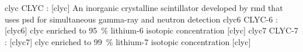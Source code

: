 \newglsXchemical%
{clyc}%
{CLYC}%
{:}%
[clyc]%
{An inorganic crystalline scintillator developed by \gls{rmd} that uses \gls{psd} for simultaneous \gls{gamma-ray} and neutron detection}%
\newglsXchemical%
{clyc6}%
{CLYC-6}%
{{}:}%
[clyc6]%
{\Glsdesc{clyc} enriched to \SI{95}{\percent} lithium-6 isotopic concentration}%
[clyc]%
\newglsXchemical%
{clyc7}%
{CLYC-7}%
{{}:}%
[clyc7]%
{\Glsdesc{clyc} enriched to \SI{99}{\percent} lithium-7 isotopic concentration}%
[clyc]%
